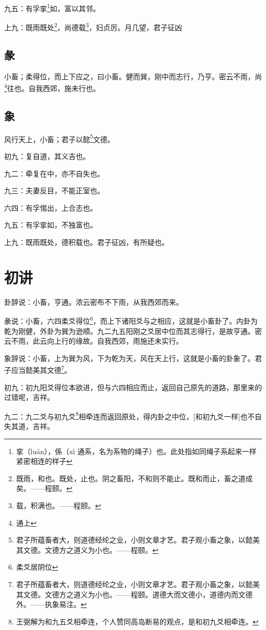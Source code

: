 \documentclass[12pt,oneside]{book}
\begin{document}
九五：有孚挛\footnote{挛（luán），係（xì 通系，名为系物的绳子）也。此处指如同绳子系起来一样紧密相连的样子}如，富以其邻。

上九：既雨既处\footnote{既雨，和也。既处，止也。阴之畜阳，不和则不能止。既和而止，畜之道成矣。——程颐。}，尚德载\footnote{载，积满也。——程颐。}，妇贞厉。月几望，君子征凶

\subsection{彖}
小畜；柔得位，而上下应之，曰小畜。健而巽，刚中而志行，乃亨。密云不雨，尚\footnote{通上}往也。自我西郊，施未行也。

\subsection{象}
风行天上，小畜；君子以懿\footnote{君子所蕴畜者大，则道德经纶之业，小则文章才艺。君子观小畜之象，以懿美其文德。文德方之道义为小也。——程颐。}文德。

初九：复自道，其义吉也。

九二：牵复在中，亦不自失也。

九三：夫妻反目，不能正室也。

六四：有孚惕出，上合志也。

九五：有孚挛如，不独富也。

上九：既雨既处，德积载也。君子征凶，有所疑也。


\section{初讲}
卦辞说：小畜，亨通。浓云密布不下雨，从我西郊而来。

彖说：小畜，六四柔爻得位\footnote{柔爻居阴位}，而上下诸阳爻与之相应，这就是小畜卦了。内卦为乾为刚健，外卦为巽为逊顺。九二九五阳刚之爻居中位而其志得行，是故亨通。密云不雨，此云向上行的缘故。自我西郊，雨施还未实行。

象辞说：小畜，上为巽为风，下为乾为天，风在天上行，这就是小畜的卦象了。君子应当懿美其文德\footnote{君子所蕴畜者大，则道德经纶之业，小则文章才艺。君子观小畜之象，以懿美其文德。文德方之道义为小也。——程颐。道德大而文德小，道德内而文德外。——执象易注。}。

初九：初九阳爻得位本欲进，但与六四相应而止，返回自己原先的道路，那里来的过错呢，吉祥。

九二：九二爻与初九爻\footnote{王弼解为和九五爻相牵连，个人赞同高岛断易的观点，是和初九爻相牵连。}相牵连而返回原处，得内卦之中位，[和初九爻一样]也不自失其道，吉祥。
\end{document}

